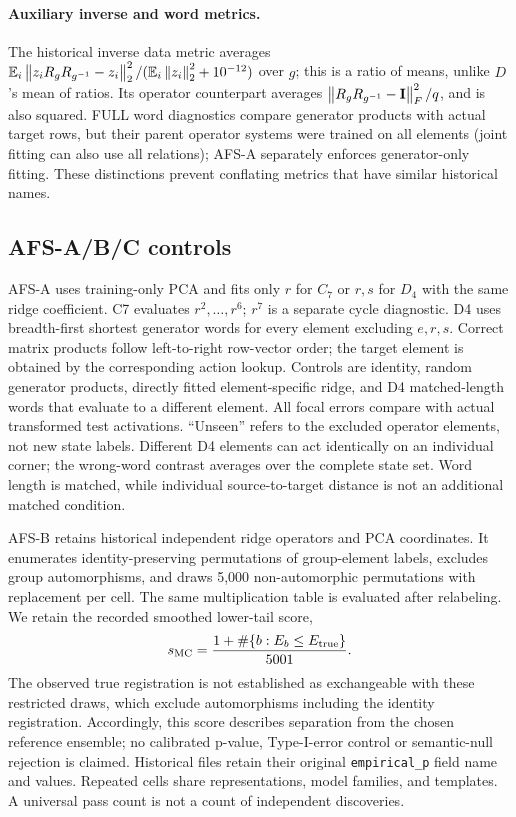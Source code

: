 \paragraph{Auxiliary inverse and word metrics.}
The historical inverse data metric averages
$\mathbb{E}_{i}\left\lVert z_iR_gR_{g^{-1}}-z_i\right\rVert_2^2/(\mathbb{E}_i\left\lVert z_i\right\rVert_2^2+10^{-12})$ over $g$; this is a ratio of means, unlike $D$'s mean of ratios. Its operator counterpart averages $\left\lVert R_gR_{g^{-1}}-\mathbf{I}\right\rVert_F^2/q$, and is also squared. FULL word diagnostics compare generator products with actual target rows, but their parent operator systems were trained on all elements (joint fitting can also use all relations); AFS-A separately enforces generator-only fitting. These distinctions prevent conflating metrics that have similar historical names.

\subsection{AFS-A/B/C controls}
AFS-A uses training-only PCA and fits only $r$ for $C_7$ or $r,s$ for $D_4$ with the same ridge coefficient. C7 evaluates $r^2,\ldots,r^6$; $r^7$ is a separate cycle diagnostic. D4 uses breadth-first shortest generator words for every element excluding $e,r,s$. Correct matrix products follow left-to-right row-vector order; the target element is obtained by the corresponding action lookup. Controls are identity, random generator products, directly fitted element-specific ridge, and D4 matched-length words that evaluate to a different element. All focal errors compare with actual transformed test activations. ``Unseen'' refers to the excluded operator elements, not new state labels. Different D4 elements can act identically on an individual corner; the wrong-word contrast averages over the complete state set. Word length is matched, while individual source-to-target distance is not an additional matched condition.

AFS-B retains historical independent ridge operators and PCA coordinates. It enumerates identity-preserving permutations of group-element labels, excludes group automorphisms, and draws 5,000 non-automorphic permutations with replacement per cell. The same multiplication table is evaluated after relabeling. We retain the recorded smoothed lower-tail score,
\[
 s_{\rm MC}=\frac{1+\#\{b:E_b\leq E_{\rm true}\}}{5001}.
\]
The observed true registration is not established as exchangeable with these restricted draws, which exclude automorphisms including the identity registration. Accordingly, this score describes separation from the chosen reference ensemble; no calibrated p-value, Type-I-error control or semantic-null rejection is claimed. Historical files retain their original \texttt{empirical\_p} field name and values. Repeated cells share representations, model families, and templates. A universal pass count is not a count of independent discoveries.

